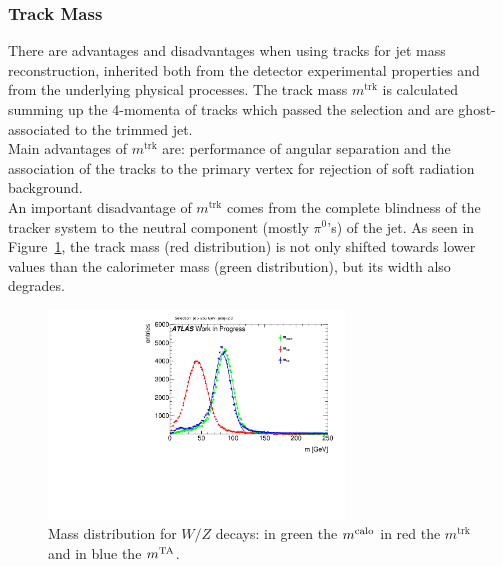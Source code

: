 \subsubsection{Track Mass}
\label{sec:tracks}
There are advantages and disadvantages when using tracks for \larger jet mass reconstruction, inherited both from the detector experimental properties and from the underlying physical processes. The track mass $m^\textrm{trk}$ is calculated summing up the 4-momenta of tracks which passed the selection and are ghost-associated to the trimmed jet.
\\ 
Main advantages of $m^\textrm{trk}$ are: performance of angular separation and the association of the tracks to the primary vertex for rejection of soft radiation background. \\
An important disadvantage of $m^\textrm{trk}$ comes from the complete blindness of the tracker system to the neutral component (mostly $\pi^0$'s) of the jet. As seen in Figure~\ref{fig:trackandcalo}, the track mass (red distribution) is not only shifted towards lower values than the calorimeter mass (green distribution), but its width also degrades. 


\begin{figure}[!ht]
  \centering
      \includegraphics[width=0.7\textwidth]{jet_part/1cfrt_h_TrackJets_m.pdf}
  \caption[Mass distribution for $W/Z$ decays]{Mass distribution for $W/Z$ decays: in green the $m^\textrm{calo}$ in red the $m^\textrm{trk}$ and in blue the $m^\textrm{TA}$. }
  \label{fig:trackandcalo}
\end{figure}


